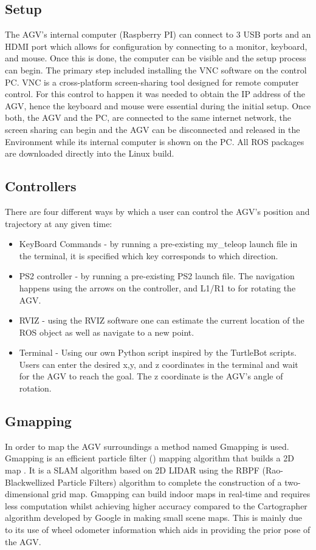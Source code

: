 \subsection{Setup}
The AGV's internal computer (Raspberry PI) can connect to 3 USB ports and an HDMI port which allows for configuration by connecting to a monitor, keyboard, and mouse.
Once this is done, the computer can be visible and the setup process can begin. 
The primary step included installing the VNC software on the control PC. VNC is a cross-platform screen-sharing tool designed for remote computer control. For this control to happen it was needed to obtain the IP address of the AGV, hence the keyboard and mouse were essential during the initial setup. Once both, the AGV and the PC, are connected to the same internet network, the screen sharing can begin and the AGV can be disconnected and released in the Environment while its internal computer is shown on the PC.       
All ROS packages are downloaded directly into the Linux build.

\subsection{Controllers}
There are four different ways by which a user can control the AGV's position and trajectory at any given time:
\begin{itemize}
  \item KeyBoard Commands - by running a pre-existing my\_teleop launch file in the terminal, it is specified which key corresponds to which direction.
  \item PS2 controller - by running a pre-existing PS2 launch file. The navigation happens using the arrows on the controller, and L1/R1 to for rotating the AGV. 
  \item RVIZ - using the RVIZ software one can estimate the current location of the ROS object as well as navigate to a new point.
  \item Terminal - Using our own Python script inspired by the TurtleBot scripts. Users can enter the desired x,y, and z coordinates in the terminal and wait for the AGV to reach the goal. The z coordinate is the AGV's angle of rotation.
\end{itemize}

\subsection{Gmapping}\label{gmapping} %
In order to map the AGV surroundings a method named Gmapping is used. 
Gmapping is an efficient particle filter (\cite{4084563}) mapping algorithm that builds a 2D map .
It is a SLAM algorithm based on 2D LIDAR using the RBPF (Rao-Blackwellized Particle Filters) algorithm to complete the construction of a two-dimensional grid map. Gmapping can build indoor maps in real-time and requires less computation whilst achieving higher accuracy compared to the Cartographer algorithm developed by Google in making small scene maps.
This is mainly due to its use of wheel odometer information which aids in providing the prior pose of the AGV.

